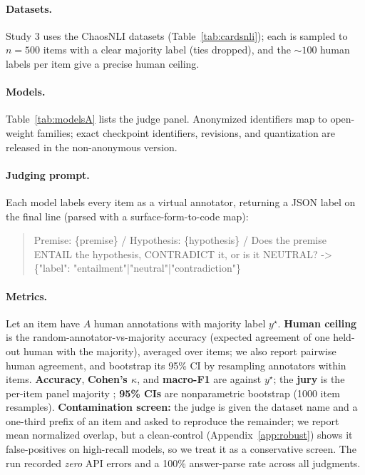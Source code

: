 \paragraph{Datasets.} Study 3 uses the \NLIndat{} ChaosNLI datasets (Table~\ref{tab:cardsnli}); each is sampled to
$n{=}500$ items with a clear majority label (ties dropped), and the ${\sim}100$ human labels per item give a precise
human ceiling.

\begin{table}[h]\centering\small
\caption{Study 3 (NLI) dataset cards. Ceiling $=$ random-annotator-vs-majority accuracy.}
\label{tab:cardsnli}

\end{table}

\paragraph{Models.} Table~\ref{tab:modelsA} lists the judge panel. Anonymized identifiers map to open-weight families; exact checkpoint identifiers, revisions, and quantization are released in the non-anonymous version.
\begin{table}[h]\centering\small
\caption{Judge panel (Studies 2--3).}\label{tab:modelsA}

\end{table}

\paragraph{Judging prompt.} Each model labels every item as a virtual annotator, returning a JSON label on the final
line (parsed with a surface-form-to-code map):
\begin{quote}\small\ttfamily
Premise: \{premise\} / Hypothesis: \{hypothesis\} / Does the premise ENTAIL the hypothesis, CONTRADICT it, or is it
NEUTRAL? -> \{"label": "entailment"|"neutral"|"contradiction"\}
\end{quote}

\paragraph{Metrics.} Let an item have $A$ human annotations with majority label $y^\star$. \textbf{Human ceiling} is
the random-annotator-vs-majority accuracy (expected agreement of one held-out human with the majority), averaged over
items; we also report pairwise human agreement, and bootstrap its 95\% CI by resampling annotators within items.
\textbf{Accuracy}, \textbf{Cohen's $\kappa$}, and \textbf{macro-F1} are against $y^\star$; the \textbf{jury} is the
per-item panel majority \citep{verga2024poll}; \textbf{95\% CIs} are nonparametric bootstrap (1000 item resamples).
\textbf{Contamination screen:} the judge is given the dataset name and a one-third prefix of an item and asked to
reproduce the remainder; we report mean normalized overlap, but a clean-control (Appendix~\ref{app:robust}) shows it
false-positives on high-recall models, so we treat it as a conservative screen. The run recorded \emph{zero} API
errors and a 100\% answer-parse rate across all \NLInjudg{} judgments.


